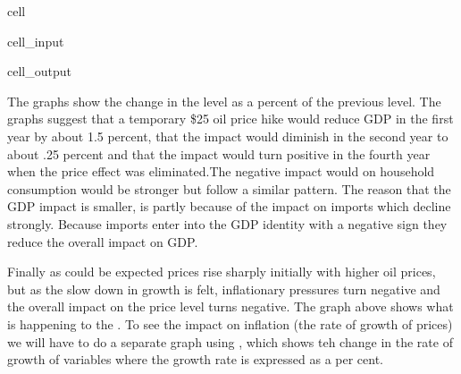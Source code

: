 \documentclass[letterpaper,10pt,english]{jupyterBook}
\begin{document}
\begin{sphinxuseclass}{cell}\begin{sphinxVerbatimInput}

\begin{sphinxuseclass}{cell_input}
\begin{sphinxVerbatim}[commandchars=\\\{\}]
\PYG{p}{[}\PYG{p}{]}
\end{sphinxVerbatim}

\end{sphinxuseclass}\end{sphinxVerbatimInput}
\begin{sphinxVerbatimOutput}

\begin{sphinxuseclass}{cell_output}
\noindent{}

\end{sphinxuseclass}\end{sphinxVerbatimOutput}

\end{sphinxuseclass}
\sphinxAtStartPar
The graphs show the change in the level as a percent of the previous level. The graphs suggest that a temporary \$25 oil price hike would reduce GDP in the first year by about 1.5 percent, that the impact would diminish in the second year to about \sphinxhyphen{}.25 percent and that the impact would turn positive in the fourth year when the price effect was eliminated.The negative impact would on household consumption would be stronger but follow a similar pattern.  The reason that the GDP impact is smaller, is partly because of the impact on imports which decline strongly.  Because imports enter into the GDP identity with a negative sign they reduce the overall impact on GDP.

\sphinxAtStartPar
Finally as could be expected prices rise sharply initially with higher oil prices, but as the slow down in growth is felt, inflationary pressures turn negative and the overall impact on the price level turns negative.  The graph above shows what is happening to the . To see the impact on inflation (the rate of growth of prices) we will have to do a separate graph using , which shows teh change in the rate of growth of variables where the growth rate is expressed as a per cent.
\end{document}
